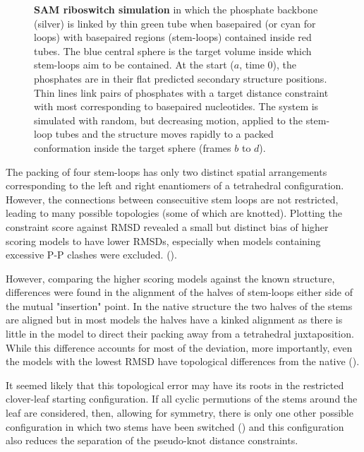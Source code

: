 \begin{figure}
\centering
{}
\caption{
\label{Fig:myo2DFS}
{\bf SAM riboswitch simulation} in which the phosphate backbone (silver) is linked by
thin green tube when basepaired (or cyan for loops) with basepaired regions (stem-loops)
contained inside red tubes.  The blue central sphere is the target volume inside which
stem-loops aim to be contained.   At the start ($a$, time 0), the phosphates are in their
flat predicted secondary structure positions.   Thin lines link pairs of phosphates with
a target distance constraint with most corresponding to basepaired nucleotides.
The system is simulated with random, but decreasing motion, applied to the stem-loop tubes
and the structure moves rapidly to a packed conformation inside the target sphere
(frames $b$ to $d$).    
}
\end{figure}

The packing of four stem-loops has only two distinct spatial arrangements corresponding to
the left and right enantiomers of a tetrahedral configuration.   However, the connections 
between consecuitive stem loops are not restricted, leading to many possible topologies
(some of which are knotted).   Plotting the constraint score against RMSD revealed a
small but distinct bias of higher scoring models to have lower RMSDs, especially when
models containing excessive P-P clashes were excluded. ().

However, comparing the higher scoring models against the known structure, differences
were found in the alignment of the halves of stem-loops either side of the mutual
"insertion" point.  In the native structure the two halves of the stems are aligned but
in most models the halves have a kinked alignment as there is little in the model to
direct their packing away from a tetrahedral juxtaposition.   While this difference
accounts for most of the deviation, more importantly, even the models with the lowest 
RMSD have topological differences from the native ().     

It seemed likely that this topological error may have its roots in the restricted
clover-leaf starting configuration.   If all cyclic permutions of the stems around the
leaf are considered, then, allowing for symmetry, there is only one other possible
configuration in which two stems have been switched (\Fig{}) and this configuration
also reduces the separation of the pseudo-knot distance constraints.


